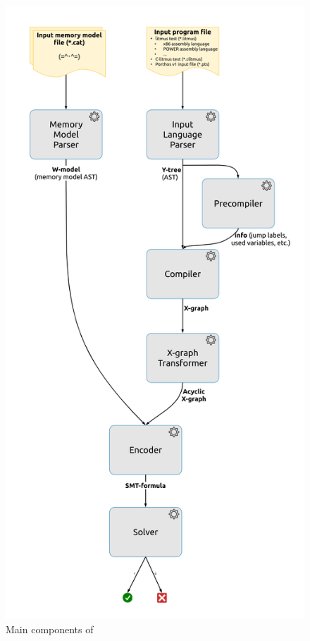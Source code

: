 \begin{figure}%
  \centering
  \includegraphics[width=\textwidth,height=\textheight,keepaspectratio]{img/my/lucidchart.com/data-flow-vert-300dpi.png}
  \caption{Main components of \porthos[2]}
  \label{fig:program-components}
\end{figure}



